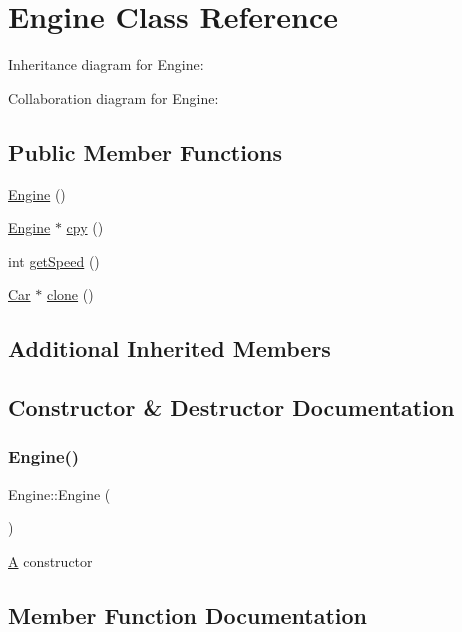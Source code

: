 \hypertarget{classEngine}{}\section{Engine Class Reference}
\label{classEngine}


Inheritance diagram for Engine\+:


Collaboration diagram for Engine\+:
\subsection*{Public Member Functions}
\begin{DoxyCompactItemize}
\item 
\hyperlink{classEngine_a8c98683b0a3aa28d8ab72a8bcd0d52f2}{Engine} ()
\item 
\hyperlink{classEngine}{Engine} $\ast$ \hyperlink{classEngine_a9cf97e7e9b82db13748a00256c1e4509}{cpy} ()
\item 
int \hyperlink{classEngine_a5f828ac1355f02d43f8bae90fbddb131}{get\+Speed} ()
\item 
\hyperlink{classCar}{Car} $\ast$ \hyperlink{classEngine_a18a3b9d950e67a868420b79890ba1428}{clone} ()
\end{DoxyCompactItemize}
\subsection*{Additional Inherited Members}


\subsection{Constructor \& Destructor Documentation}
\mbox{\label{classEngine_a8c98683b0a3aa28d8ab72a8bcd0d52f2}} 
\subsubsection{\texorpdfstring{Engine()}{Engine()}}
{\footnotesize\ttfamily Engine\+::\+Engine (\begin{DoxyParamCaption}{ }\end{DoxyParamCaption})}

\hyperlink{classA}{A} constructor 

\subsection{Member Function Documentation}
\mbox{\label{classEngine_a18a3b9d950e67a868420b79890ba1428}} 
